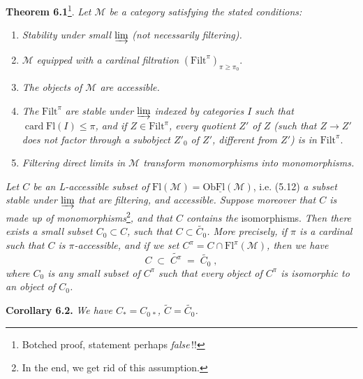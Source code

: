 \documentclass[11pt]{article}
\newcommand{\msp}[1]{\marginpar{\footnotesize [#1]}}
\newcommand{\Filt}{\mathrm{Filt}}
\newcommand{\Fl}{\mathrm{Fl}}
\newcommand{\Ob}{\mathrm{Ob}}
\newcommand{\card}{\operatorname{card}}
\newcommand{\uFl}{\underline{\mathrm{Fl}}}
\begin{document}
\setcounter{footnote}{25}
\textbf{Theorem 6.1}\footnote{Botched proof, statement perhaps \textit{false}\,!!}. \textit{Let $\mathcal{M}$ be a category satisfying the stated conditions:}
\begin{enumerate}[label={}]
\item[a)] \textit{Stability under small} $\varinjlim$ \textit{(not necessarily filtering).}
\item[b)] $\mathcal{M}$ \textit{equipped with a cardinal filtration} $(\Filt^{\pi})_{\pi\geq\pi_{0}}$.
\item[c)] \textit{The objects of $\mathcal{M}$ are accessible.}
\item[d)] \textit{The} $\Filt^{\pi}$ \textit{are stable under} $\varinjlim$ \textit{indexed by categories $I$ such that} $\card \Fl(I) \leq \pi$\textit{, and if $Z \in \Filt^{\pi}$, every quotient $Z'$ of $Z$ (such that $Z \longrightarrow Z'$ does not factor through a subobject $Z'_{0}$ of $Z'$, different from $Z'$) is in} $\Filt^{\pi}$.
\item[e)] \textit{Filtering direct limits in $\mathcal{M}$ transform monomorphisms into monomorphisms.}
\end{enumerate}
\textit{Let $C$ be an L-accessible subset of} $\Fl(\mathcal{M}) = \Ob\uFl(\mathcal{M})$, i.e. (5.12) \textit{a subset stable under} $\varinjlim$ \textit{that are filtering, and accessible. Suppose moreover that $C$ is made up of monomorphisms}\footnote{In the end, we get rid of this assumption.}\textit{, and that $C$ contains the} isomorphisms. \textit{Then there exists a small subset $C_{0} \subset C$, such that $C \subset \widetilde{C_{0}}$. More precisely, if $\pi$ is a cardinal such that $C$ is $\pi$-accessible, and if we set $C^{\pi} = C \cap \Fl^{\pi}(\mathcal{M})$, then we have}
\msp{page 77}
\[
C \;\subset\; \widetilde{C^{\pi}} \;=\; \widetilde{C_{0}} \; ,
\tag*{(6.1.1)}
\]
\textit{where $C_{0}$ is any small subset of $C^{\pi}$ such that every object of $C^{\pi}$ is isomorphic to an object of $C_{0}$.}

\textbf{Corollary 6.2.} \textit{We have $C_{*} = C_{0\,*}$, $\widetilde{C} = \widetilde{C_{0}}$.}
\end{document}
